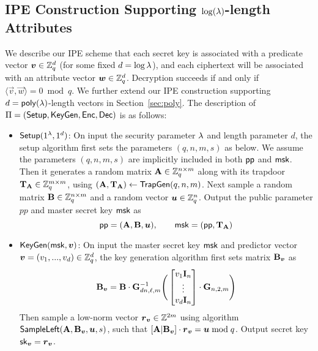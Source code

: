 \subsection{IPE Construction Supporting $\log(\lambda)$-length Attributes} \label{sec:log}
We describe our IPE scheme that each secret key is associated with a predicate vector $\boldsymbol{v} \in \mathbb{Z}^{d}_{q}$ (for some fixed $d = \log \lambda$), and each ciphertext will be associated with an attribute vector $\boldsymbol{w} \in \mathbb{Z}^{d}_{q}$. Decryption succeeds if and only if $\langle \vec{v},\vec{w} \rangle=0 \bmod q$. We further extend our IPE construction supporting $d = \mathsf{poly}(\lambda)$-length vectors in Section~\ref{sec:poly}. The description of $\Pi = (\mathsf{Setup}, \mathsf{KeyGen}, \mathsf{Enc}, \mathsf{Dec})$ is as follows:
\begin{itemize}[leftmargin=*]
 \item $\mathsf{Setup}(1^\lambda, 1^d)$: On input the security parameter $\lambda$ and length parameter $d$, the setup algorithm first sets the parameters $(q, n, m, s)$ as below. We assume the parameters $(q, n, m, s)$ are implicitly included in both $\mathsf{pp}$ and $\mathsf{msk}$. Then it generates a random matrix $\mathbf{A} \in \mathbb{Z}_q^{n \times m}$ along with its trapdoor $\mathbf{T}_{\mathbf{A}} \in \mathbb{Z}_q^{m \times m}$, using $(\mathbf{A}, \mathbf{T}_{\mathbf{A}}) \leftarrow \mathsf{TrapGen}(q, n, m)$. Next sample a random matrix $\mathbf{B} \in \mathbb{Z}_q^{n \times m}$ and a random vector $\boldsymbol{u} \in \mathbb{Z}_q^n$.  Output the public parameter $pp$ and master secret key $\mathsf{msk}$ as
  $$\mathsf{pp} = (\mathbf{A}, \mathbf{B}, \boldsymbol{u}), \qquad \mathsf{msk} = (\mathsf{pp}, \mathbf{T}_{\mathbf{A}})$$

 \item $\mathsf{KeyGen}(\mathsf{msk}, \boldsymbol{v})$: On input the master secret key $\mathsf{msk}$ and predictor vector $\boldsymbol{v} = (v_1,..., v_d) \in \mathbb{Z}_q^d$, the key generation algorithm first sets matrix $\mathbf{B}_{\boldsymbol{v}}$ as
 $$\mathbf{B}_{\boldsymbol{v}} = \mathbf{B} \cdot \mathbf{G}_{dn, \ell, m}^{-1}
 \Bigg(\begin{bmatrix}
v_{1}\mathbf{I}_n \\
\vdots \\
v_{d}\mathbf{I}_n
\end{bmatrix} \cdot \mathbf{G}_{n, 2, m}\Bigg) $$
 Then sample a low-norm vector $\boldsymbol{r}_{\boldsymbol{v}} \in \mathbb{Z}^{2m}$ using algorithm $\mathsf{SampleLeft}(\mathbf{A}, \mathbf{B}_{\boldsymbol{v}}, \boldsymbol{u}, s)$, such that $[\mathbf{A} | \mathbf{B}_{\boldsymbol{v}}] \cdot \boldsymbol{r}_{\boldsymbol{v}} = \boldsymbol{u} \bmod q$. Output secret key $\mathsf{sk}_{\boldsymbol{v}} = \boldsymbol{r}_{\boldsymbol{v}}$.


\end{itemize}
